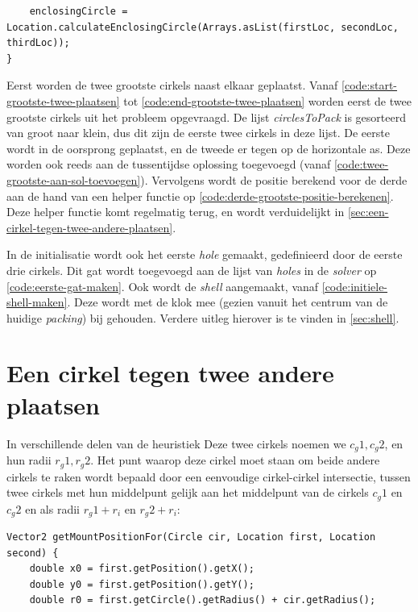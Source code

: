 \documentclass[12pt,a4paper,oneside]{book}
\begin{document}
{\begin{lstlisting}
	enclosingCircle = Location.calculateEnclosingCircle(Arrays.asList(firstLoc, secondLoc, thirdLoc));
}
\end{lstlisting}

Eerst worden de twee grootste cirkels naast elkaar geplaatst.
Vanaf \autoref{code:start-grootste-twee-plaatsen} tot \autoref{code:end-grootste-twee-plaatsen} worden eerst de twee grootste cirkels uit het probleem opgevraagd.
De lijst \textit{circlesToPack} is gesorteerd van groot naar klein, dus dit zijn de eerste twee cirkels in deze lijst.
De eerste wordt in de oorsprong geplaatst, en de tweede er tegen op de horizontale as.
Deze worden ook reeds aan de tussentijdse oplossing toegevoegd (vanaf \autoref{code:twee-grootste-aan-sol-toevoegen}).
Vervolgens wordt de positie berekend voor de derde aan de hand van een helper functie op \autoref{code:derde-grootste-positie-berekenen}.
Deze helper functie komt regelmatig terug, en wordt verduidelijkt in \autoref{sec:een-cirkel-tegen-twee-andere-plaatsen}.

In de initialisatie wordt ook het eerste \textit{hole} gemaakt, gedefinieerd door de eerste drie cirkels.
Dit gat wordt toegevoegd aan de lijst van \textit{holes} in de \textit{solver} op \autoref{code:eerste-gat-maken}.
Ook wordt de \textit{shell} aangemaakt, vanaf \autoref{code:initiele-shell-maken}.
Deze wordt met de klok mee (gezien vanuit het centrum van de huidige \textit{packing}) bij gehouden.
Verdere uitleg hierover is te vinden in \autoref{sec:shell}.

\section{Een cirkel tegen twee andere plaatsen} \label{sec:een-cirkel-tegen-twee-andere-plaatsen}

In verschillende delen van de heuristiek %
Deze twee cirkels noemen we $c_g1, c_g2$, en hun radii $r_g1, r_g2$.
Het punt waarop deze cirkel moet staan om beide andere cirkels te raken wordt bepaald door een eenvoudige cirkel-cirkel intersectie, tussen twee cirkels met hun middelpunt gelijk aan het middelpunt van de cirkels $c_g1$ en $c_g2$ en als radii $r_g1+r_i$ en $r_g2+r_i$:

\begin{lstlisting}
Vector2 getMountPositionFor(Circle cir, Location first, Location second) {
	double x0 = first.getPosition().getX();
	double y0 = first.getPosition().getY();
	double r0 = first.getCircle().getRadius() + cir.getRadius();


\end{lstlisting}}
\end{document}
